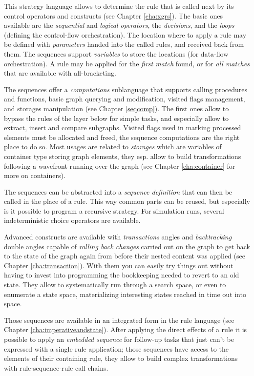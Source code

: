 This strategy language allows to determine the rule that is called next by its control operators and constructs (see Chapter \ref{cha:xgrs}).
The basic ones available are the \emph{sequential} and \emph{logical operators}, the \emph{decisions}, and the \emph{loops} (defining the control-flow orchestration).
The location where to apply a rule may be defined with \emph{parameters} handed into the called rules, and received back from them. 
The sequences support \emph{variables} to store the locations (for data-flow orchestration).
A rule may be applied for the \emph{first match} found, or for \emph{all matches} that are available with all-bracketing.

The sequences offer a \emph{computations} sublanguage that supports calling procedures and functions, basic graph querying and modification, visited flags management, and storages manipulation (see Chapter \ref{seqcomp}).
The first ones allow to bypass the rules of the layer below for simple tasks, and especially allow to extract, insert and compare subgraphs. 
Visited flags used in marking processed elements must be allocated and freed, the sequence computations are the right place to do so.
Most usages are related to \emph{storages} which are variables of container type storing graph elements, they esp. allow to build transformations following a wavefront running over the graph (see Chapter \ref{cha:container} for more on containers).

The sequences can be abstracted into a \emph{sequence definition} that can then be called in the place of a rule.
This way common parts can be reused, but especially is it possible to program a recursive strategy.
For simulation runs, several indeterministic choice operators are available.

Advanced constructs are available with \emph{transactions} angles and \emph{backtracking} double angles capable of \emph{rolling back changes} carried out on the graph to get back to the state of the graph again from before their nested content was applied (see Chapter \ref{cha:transaction}).
With them you can easily try things out without having to invest into programming the bookkeeping needed to revert to an old state.
They allow to systematically run through a search space, or even to enumerate a state space, materializing interesting states reached in time out into space.

Those sequences are available in an integrated form in the rule language (see Chapter \ref{cha:imperativeandstate}).
After applying the direct effects of a rule it is possible to apply an \emph{embedded sequence} for follow-up tasks that just can't be expressed with a single rule application; those sequences have access to the elements of their containing rule, they allow to build complex transformations with rule-sequence-rule call chains.
		
